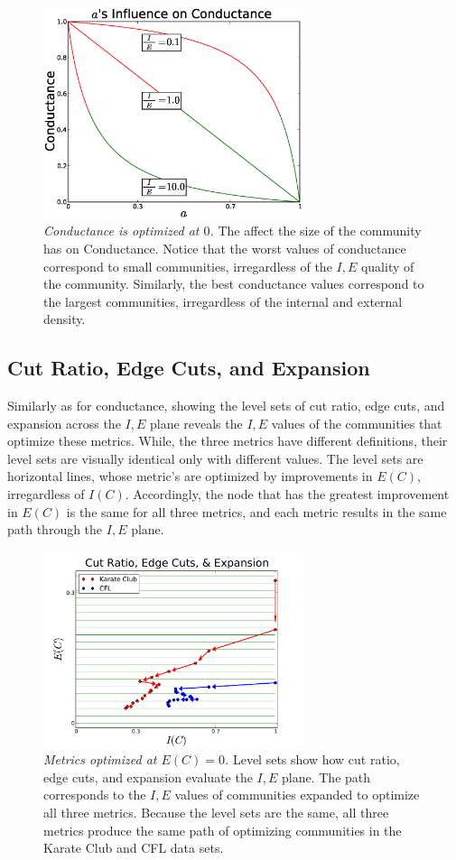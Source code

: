 \documentclass[conference]{IEEEtran}
\begin{document}
\begin{figure}[!h]
\centering
\includegraphics[width=3in]{Figures/Conductance_a}
\caption{{\it Conductance is optimized at $0$.}  The affect the size of the community has on {\sc Conductance}.  Notice that the worst values of conductance correspond to small communities, irregardless of the $I,E$ quality of the community.  Similarly, the best conductance values correspond to the largest communities, irregardless of the internal and external density.}
\label{fig_conductance_a}
\end{figure}

\subsection{Cut Ratio, Edge Cuts, and Expansion}

Similarly as for conductance, showing the level sets of cut ratio, edge cuts, and expansion across the $I,E$ plane reveals the $I,E$ values of the communities that optimize these metrics.  While, the three metrics have different definitions, their level sets are visually identical only with different values.  The level sets are horizontal lines, whose metric's are optimized by improvements in $E(C)$, irregardless of $I(C)$.  Accordingly, the node that has the greatest improvement in $E(C)$ is the same for all three metrics, and each metric results in the same path through the $I,E$ plane.

\begin{figure}[!h]
\centering
\includegraphics[width=3in]{Figures/cuts_expansion}
\caption{{\it Metrics optimized at $E(C) = 0$.}  Level sets show how cut ratio, edge cuts, and expansion evaluate the $I,E$ plane.  The path corresponds to the $I,E$ values of communities expanded to optimize all three metrics.  Because the level sets are the same, all three metrics produce the same path of optimizing communities in the Karate Club and CFL data sets.}
\label{fig_cuts_expansion}
\end{figure}
\end{document}
